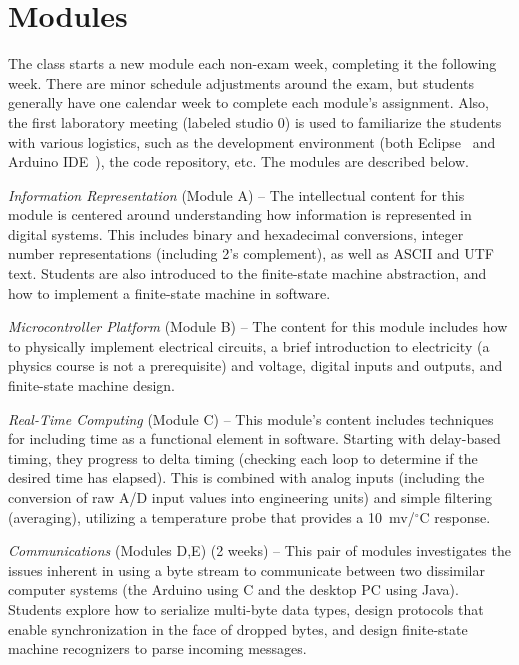 \section{Modules}
\label{sec:weeks}

The class starts a new module each
non-exam week, completing it the following week. There are minor schedule
adjustments around the exam, but students generally have one calendar week
to complete each module's assignment.
Also, the first laboratory meeting (labeled studio 0) is used to familiarize
the students with various logistics, such as the development environment
(both Eclipse~\cite{eclipse} and Arduino IDE~\cite{arduino}),
the code repository, etc.
The modules are described below.

\emph{Information Representation} (Module A) --
The intellectual content for this module is centered around understanding
how information is represented in digital systems. This includes binary and
hexadecimal conversions, integer
number representations (including 2's complement), as well as
ASCII and UTF text.
Students are also introduced to the finite-state machine abstraction,
and how to implement a finite-state machine in software.

\emph{Microcontroller Platform} (Module B) --
The content for this module includes how to physically implement electrical
circuits, a brief introduction to electricity (a physics course is not a
prerequisite) and voltage, digital inputs and outputs, and finite-state
machine design.

\emph{Real-Time Computing} (Module C) --
This module's content includes techniques for including time as a functional
element in software. Starting with delay-based timing, they progress to delta
timing (checking each loop to determine if the desired time has elapsed).
This is combined with analog inputs (including the conversion of raw A/D
input values into engineering units) and simple filtering (averaging),
utilizing a temperature probe that provides a 10~mv/$^\circ$C response.

\emph{Communications} (Modules D,E) (2 weeks) --
This pair of modules investigates the issues inherent in using a byte stream
to communicate between two dissimilar computer systems (the Arduino using C
and the desktop PC using Java).  Students explore how
to serialize multi-byte data types, design protocols that enable synchronization
in the face of dropped bytes,
and design finite-state machine recognizers to parse incoming messages.

